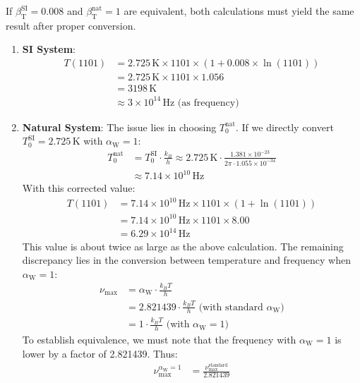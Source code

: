 \documentclass[12pt,a4paper]{article}
\newcommand{\betaT}{\beta_{\text{T}}}
\newcommand{\alphaW}{\alpha_{\text{W}}}
\begin{document}
	If \(\betaT^{\text{SI}} = 0.008\) and \(\betaT^{\text{nat}} = 1\) are equivalent, both calculations must yield the same result after proper conversion.
	
	\begin{enumerate}
		\item \textbf{SI System}:
		\begin{align}
			T(1101) &= 2.725 \, \text{K} \times 1101 \times (1 + 0.008 \times \ln(1101)) \\
			&= 2.725 \, \text{K} \times 1101 \times 1.056 \\
			&= 3198 \, \text{K} \\
			&\approx 3 \times 10^{14} \, \text{Hz} \text{ (as frequency)}
		\end{align}
		\item \textbf{Natural System}:
		The issue lies in choosing \(T_0^{\text{nat}}\). If we directly convert \(T_0^{\text{SI}} = 2.725 \, \text{K}\) with \(\alphaW = 1\):
		\begin{align}
			T_0^{\text{nat}} &= T_0^{\text{SI}} \cdot \frac{k_B}{h} \approx 2.725 \, \text{K} \cdot \frac{1.381 \times 10^{-23}}{2\pi \cdot 1.055 \times 10^{-34}} \\
			&\approx 7.14 \times 10^{10} \, \text{Hz}
		\end{align}
		With this corrected value:
		\begin{align}
			T(1101) &= 7.14 \times 10^{10} \, \text{Hz} \times 1101 \times (1 + \ln(1101)) \\
			&= 7.14 \times 10^{10} \, \text{Hz} \times 1101 \times 8.00 \\
			&= 6.29 \times 10^{14} \, \text{Hz}
		\end{align}
		This value is about twice as large as the above calculation. The remaining discrepancy lies in the conversion between temperature and frequency when \(\alphaW = 1\):
		\begin{align}
			\nu_{\text{max}} &= \alphaW \cdot \frac{k_B T}{h} \\
			&= 2.821439 \cdot \frac{k_B T}{h} \text{ (with standard \(\alphaW\))} \\
			&= 1 \cdot \frac{k_B T}{h} \text{ (with \(\alphaW = 1\))}
		\end{align}
		To establish equivalence, we must note that the frequency with \(\alphaW = 1\) is lower by a factor of 2.821439. Thus:
		\begin{align}
			\nu_{\text{max}}^{\alphaW = 1} &= \frac{\nu_{\text{max}}^{\text{standard}}}{2.821439} \\

\end{align}
\end{enumerate}
\end{document}
